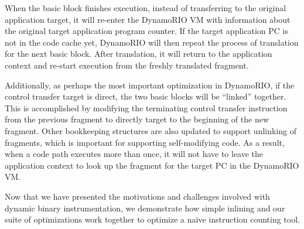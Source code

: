 When the basic block finishes execution, instead of transferring to the original
application target, it will re-enter the DynamoRIO VM with information about the
original target application program counter.  If the target application PC is
not in the code cache yet, DynamoRIO will then repeat the process of translation
for the next basic block.  After translation, it will return to the application
context and re-start execution from the freshly translated fragment.

Additionally, as perhaps the most important optimization in DynamoRIO, if the
control transfer target is direct, the two basic blocks will be ``linked''
together.  This is accomplished by modifying the terminating control transfer
instruction from the previous fragment to directly target to the beginning of
the new fragment.  Other bookkeeping structures are also updated to support
unlinking of fragments, which is important for supporting self-modifying code.
As a result, when a code path executes more than once, it will not have to leave
the application context to look up the fragment for the target PC in the
DynamoRIO VM.

Now that we have presented the motivations and challenges involved with dynamic
binary instrumentation, we demonstrate how simple inlining and our suite of
optimizations work together to optimize a na\"ive instruction counting tool.
